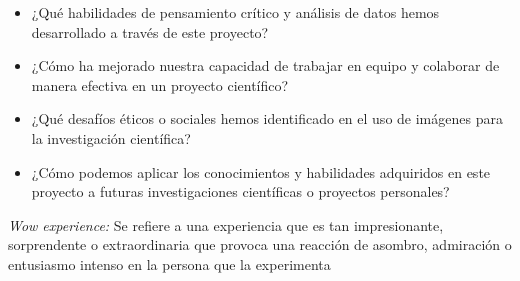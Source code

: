 \begin{itemize}
\begin{itemize}
        \item ¿Qué habilidades de pensamiento crítico y análisis de datos hemos desarrollado a través de este proyecto?
        \item ¿Cómo ha mejorado nuestra capacidad de trabajar en equipo y colaborar de manera efectiva en un proyecto científico?
        \item ¿Qué desafíos éticos o sociales hemos identificado en el uso de imágenes para la investigación científica?
        \item ¿Cómo podemos aplicar los conocimientos y habilidades adquiridos en este proyecto a futuras investigaciones científicas o proyectos personales?
    \end{itemize}
\end{itemize}

\textit{Wow experience:} Se refiere a una experiencia que es tan impresionante, sorprendente o extraordinaria que provoca una reacción de asombro, admiración o entusiasmo intenso en la persona que la experimenta
